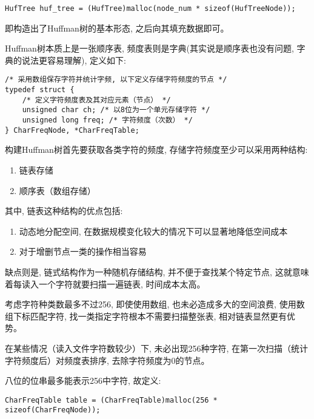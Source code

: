 \documentclass[a4paper]{ctexart}
\begin{document}
{\setmainfont{Courier New Bold}              
\begin{lstlisting}
HufTree huf_tree = (HufTree)malloc(node_num * sizeof(HufTreeNode));
\end{lstlisting}}

即构造出了Huffman树的基本形态, 之后向其填充数据即可。

Huffman树本质上是一张顺序表, 频度表则是字典(其实说是顺序表也没有问题, 字典的说法更容易理解), 定义如下:

{\setmainfont{Courier New Bold}              
\begin{lstlisting}
/* 采用数组保存字符并统计字频, 以下定义存储字符频度的节点 */
typedef struct {
    /* 定义字符频度表及其对应元素（节点） */
    unsigned char ch; /* 以8位为一个单元存储字符 */
    unsigned long freq; /* 字符频度（次数） */
} CharFreqNode, *CharFreqTable;
\end{lstlisting}}

构建Huffman树首先要获取各类字符的频度, 存储字符频度至少可以采用两种结构:

\begin{enumerate}
\def\labelenumi{\arabic{enumi}.}
\item
  链表存储
\item
  顺序表（数组存储）
\end{enumerate}

其中, 链表这种结构的优点包括:

\begin{enumerate}
\def\labelenumi{\arabic{enumi}.}
\item
  动态地分配空间, 在数据规模变化较大的情况下可以显著地降低空间成本
\item
  对于增删节点一类的操作相当容易
\end{enumerate}

缺点则是, 链式结构作为一种随机存储结构, 并不便于查找某个特定节点, 这就意味着每读入一个字符就要扫描一遍链表, 时间成本太高。

考虑字符种类数最多不过256, 即使使用数组, 也未必造成多大的空间浪费, 使用数组下标匹配字符, 找一类指定字符根本不需要扫描整张表, 相对链表显然更有优势。

在某些情况（读入文件字符数较少）下, 未必出现256种字符, 在第一次扫描（统计字符频度后）对频度表排序, 去除字符频度为0的节点。

八位的位串最多能表示256中字符, 故定义:

{\setmainfont{Courier New Bold}              
\begin{lstlisting}
CharFreqTable table = (CharFreqTable)malloc(256 * sizeof(CharFreqNode));
\end{lstlisting}}
\end{document}
